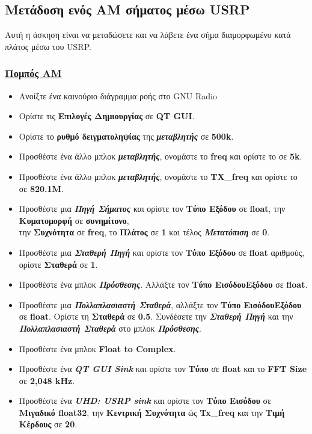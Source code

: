 \documentclass[12pt]{report}
\begin{document}
        \subsection{\textsf{Μετάδοση ενός AM σήματος μέσω USRP}}
            Αυτή η άσκηση είναι να μεταδώσετε και να λάβετε ένα σήμα διαμορφωμένο κατά πλάτος μέσω του USRP.
            \subsubsection*{\textsf{\underline{Πομπός AM}}}
            \begin{itemize}
                \item Ανοίξτε ένα καινούριο διάγραμμα ροής στο GNU Radio
                \item Ορίστε τις \textbf{Επιλογές Δημιουργίας} σε \textbf{QT GUI}.
                \item Ορίστε το \textbf{ρυθμό δειγματοληψίας} της \textbf{\textit{μεταβλητής}} σε \textbf{500k}.
                \item Προσθέστε ένα άλλο μπλοκ \textbf{\textit{μεταβλητής}},
                    ονομάστε το \textbf{freq} και ορίστε το σε \textbf{5k}.
                \item Προσθέστε ένα άλλο μπλοκ \textbf{\textit{μεταβλητής}}, 
                    ονομάστε το \textbf{TX\_freq} και ορίστε το σε \textbf{820.1M}.
                \item Προσθέστε μια \textbf{\textit{Πηγή Σήματος}} και ορίστε τον \textbf{Τύπο Εξόδου}
                σε \textbf{float}, την \textbf{Κυματομορφή} σε \textbf{συνημίτονο},\\
                την \textbf{Συχνότητα} σε \textbf{freq}, το \textbf{Πλάτος} σε \textbf{1} και τέλος 
                \textbf{\textit{Μετατόπιση}} σε \textbf{0}.
                \item Προσθέστε μια \textbf{\textit{Σταθερή Πηγή}} και ορίστε τον \textbf{Τύπο Εξόδου}
                    σε \textbf{float} αριθμούς, ορίστε \textbf{Σταθερά} σε \textbf{1}.
                \item Προσθέστε ένα μπλοκ \textbf{\textit{Πρόσθεσης}}. Αλλάξτε τον \textbf{Τύπο ΕισόδουΕξόδου}
                 σε \textbf{float}.
                \item Προσθέστε μια \textbf{\textit{Πολλαπλασιαστή Σταθερά}}, αλλάξτε τον \textbf{Τύπο ΕισόδουΕξόδου}
                 σε \textbf{float}. Ορίστε τη \textbf{Σταθερά} σε \textbf{0.5}. Συνδέσετε την 
                 \textbf{\textit{Σταθερή Πηγή}} και την \textbf{\textit{Πολλαπλασιαστή Σταθερά}}
                 στο μπλοκ \textbf{\textit{Πρόσθεσης}}.
                \item Προσθέστε ένα μπλοκ \textbf{\textsf{Float to Complex}}.
                \item Προσθέστε ένα \textbf{\textit{QT GUI Sink}} και ορίστε τον \textbf{Τύπο} σε
                 \textbf{float} και το \textbf{FFT Size} σε \textbf{2,048 kHz}.
                \item Προσθέστε ένα \textbf{\textit{UHD: USRP sink}} και ορίστε τον \textbf{Τύπο Εισόδου}
                 σε \textbf{Μιγαδικό float32}, την \textbf{Κεντρική Συχνότητα} ώς \textbf{Tx\_freq} και
                 την \textbf{Τιμή Κέρδους} σε \textbf{20}.                
            \end{itemize}
\end{document}
